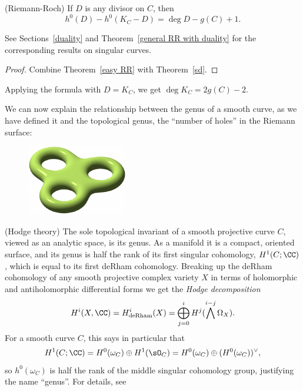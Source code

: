 \begin{theorem} (Riemann-Roch)\label{RR theorem}
If $D$ is any divisor on $C$, then 
$$
h^0(D) - h^0(K_C -D) = \deg D - g(C) +1.
$$
\end{theorem}
See Sections~\ref{duality} and Theorem~\ref{general RR with duality} for the corresponding results on singular curves.

\begin{proof}
Combine Theorem~\ref{easy RR} with Theorem~\ref{sd}.
\end{proof}
Applying the formula with $D = K_C$, we get 
$\deg K_C = 2g(C) -2$.

We can now explain the relationship between the genus of a smooth curve, as we have defined it and the 
topological genus, the ``number of holes'' in the Riemann surface:


\begin{figure}[htbp]   %
\begin{center}
\includegraphics[scale = 1]{main/Fig02-RiemannSurface}
\label{RiemannSurface}
\end{center}
\end{figure}

\begin{fact} (Hodge theory)
The sole topological invariant of a smooth projective curve $C$, viewed as an analytic space, is its genus. As a manifold it is a compact, oriented surface, and its genus is half the rank of its first singular cohomology, $H^{1}(C; \CC)$, which is equal to its first deRham cohomology.
Breaking up the deRham cohomology of any smooth projective complex variety $X$ in terms of holomorphic and antiholomorphic differential
forms we get the \emph{Hodge decomposition}
$$
H^i(X,\CC) = H^i_{\rm de Rham}(X) = \bigoplus_{j=0}^i H^j(\bigwedge^{i-j} \Omega_X).
$$
For a smooth curve $C$, this says in  particular that
$$
H^1(C; \CC) = H^0(\omega_C)\oplus H^1(\sO_C) = H^0(\omega_C)\oplus (H^0(\omega_C))^\vee, 
$$
so $ h^0(\omega_C)$ is half the rank of the middle singular cohomology group, justifying the name ``genus''. For details, see~\cite[p. 116]{Griffiths-Harris1978}
\end{fact}


